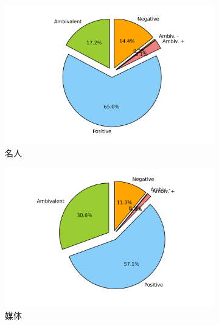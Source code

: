 \documentclass[12pt, oneside]{article}
\begin{document}
\begin{spacing}{1.5}
\begin{CJK}{UTF8}{gbsn}
\begin{figure}
\begin{subfigure}[b]{0.3\linewidth}
		\includegraphics[trim = 1.5cm 0 1.5cm 0, clip = true, width=\textwidth]{../result/charts/emotion_identification_celebrities}
		\caption{名人}
	\end{subfigure}
	\begin{subfigure}[b]{0.3\linewidth}
		\centering
		\includegraphics[trim = 1.5cm 0 1.5cm 0, clip = true, width=\textwidth]{../result/charts/emotion_identification_media}
		\caption{媒体}
	\end{subfigure}
	\\
	\begin{subfigure}[b]{0.3\linewidth}
		\centering

\end{subfigure}
\end{figure}
\end{CJK}
\end{spacing}
\end{document}
